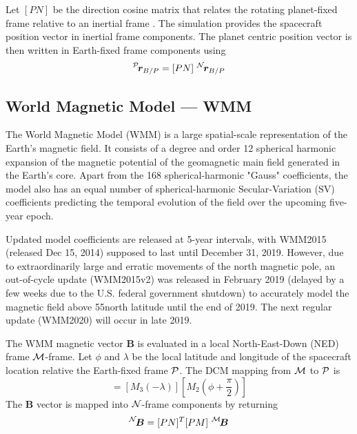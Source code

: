 Let $[PN]$ be the direction cosine matrix\cite{schaub} that relates the rotating planet-fixed frame relative to an inertial frame .  The simulation provides the spacecraft position vector in inertial frame components.  The planet centric position vector is then written in Earth-fixed frame components using
\begin{equation}
	\leftexp{P}{\bm r}_{B/P} = [PN] \ \leftexp{N}{\bm r}_{B/P}
\end{equation}




\subsection{World Magnetic Model --- WMM}
The World Magnetic Model (WMM) is a large spatial-scale representation of the Earth's magnetic field. It consists of a degree and order 12 spherical harmonic expansion of the magnetic potential of the geomagnetic main field generated in the Earth's core. Apart from the 168 spherical-harmonic "Gauss" coefficients, the model also has an equal number of spherical-harmonic Secular-Variation (SV) coefficients predicting the temporal evolution of the field over the upcoming five-year epoch. 

Updated model coefficients are released at 5-year intervals, with WMM2015 (released Dec 15, 2014) supposed to last until December 31, 2019. However, due to extraordinarily large and erratic movements of the north magnetic pole, an out-of-cycle update (WMM2015v2) was released in February 2019 (delayed by a few weeks due to the U.S. federal government shutdown) to accurately model the magnetic field above 55\dg north latitude until the end of 2019. The next regular update (WMM2020) will occur in late 2019.

The WMM magnetic vector $\bm B$ is evaluated in a local North-East-Down (NED) frame $\cal M$-frame.  Let $\phi$ and $\lambda$ be the local latitude and longitude of the spacecraft location relative the Earth-fixed frame $\cal P$.  The DCM mapping from $\cal M$ to $\cal P$ is
\begin{equation}
	[PM] = [M_{3}(-\lambda)][M_{2}(\phi + \frac{\pi}{2})]
\end{equation}
The $\bm B$ vector is mapped into $\cal N$-frame components by returning
\begin{equation}
	\leftexp{N}{\bm B} = [PN]^{T} [PM] \ \leftexp{M}{\bm B}
\end{equation}

